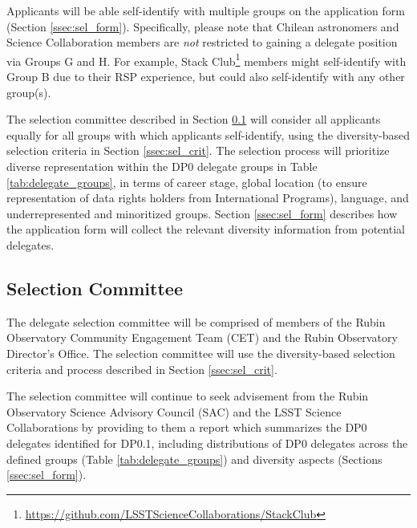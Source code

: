 \documentclass[DM,lsstdraft,authoryear,toc]{lsstdoc}
\begin{document}
Applicants will be able self-identify with multiple groups on the application form (Section \ref{ssec:sel_form}).
Specifically, please note that Chilean astronomers and Science Collaboration members are {\it not} restricted to gaining a delegate position via Groups G and H. 
For example, Stack Club\footnote{\url{https://github.com/LSSTScienceCollaborations/StackClub}} members might self-identify with Group B due to their RSP experience, but could also self-identify with any other group(s).

The selection committee described in Section \ref{ssec:sel_comm} will consider all applicants equally for all groups with which applicants self-identify, using the diversity-based selection criteria in Section \ref{ssec:sel_crit}.
The selection process will prioritize diverse representation within the DP0 delegate groups in Table \ref{tab:delegate_groups}, in terms of career stage, global location (to ensure representation of data rights holders from International Programs), language, and underrepresented and minoritized groups.
Section \ref{ssec:sel_form} describes how the application form will collect the relevant diversity information from potential delegates.

\subsection{Selection Committee}\label{ssec:sel_comm}

The delegate selection committee will be comprised of members of the Rubin Observatory Community Engagement Team (CET) and the Rubin Observatory Director's Office.
The selection committee will use the diversity-based selection criteria and process described in Section \ref{ssec:sel_crit}.

The selection committee will continue to seek advisement from the Rubin Observatory Science Advisory Council (SAC) and the LSST Science Collaborations by providing to them a report which summarizes the DP0 delegates identified for DP0.1, including distributions of DP0 delegates across the defined groups (Table \ref{tab:delegate_groups}) and diversity aspects (Sections \ref{ssec:sel_form}).

\end{document}
